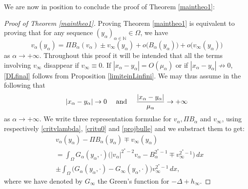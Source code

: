 \documentclass[10pt]{amsart}
\numberwithin{equation}{section}
\newcommand{\Om}{\Omega}
\newcommand{\ma}{\mu_\alpha}
\def \bb{\hbox}
\def \ma{\mu_{\alpha}}
\def \yl{y_{\alpha}}
\def \hi{h_{\infty}}
\def \nn{\mathbb{N}}
\theoremstyle{plain}
\theoremstyle{remark}
\begin{document}
			 
We are now in position to conclude the proof of Theorem \ref{maintheo1}:

\begin{proof}[Proof of Theorem \ref{maintheo1}]
Proving Theorem \ref{maintheo1} is equivalent to proving that for any sequence $(\yl)_{\alpha\in\nn}\in \Om$, we have
\begin{equation}\label{DLfinal}
v_\alpha(y_\alpha) = \Pi B_\alpha(v_\alpha) \pm v_\infty(y_\alpha) + o \big( B_\alpha(y_\alpha) \big) + o \big( v_\infty(y_\alpha) \big)
\end{equation}
as $\alpha \to + \infty$. Throughout this proof it will be intended that all the terms involving $v_\infty$ disappear if $v_\infty \equiv 0$. If $|x_\alpha - y_\alpha| = O(\ma)$ or if $|x_\alpha - y_\alpha| \not \to 0$, \eqref{DLfinal} follows from Proposition \ref{limiteinLinfini}. We may thus assume in the following that
\begin{equation}\label{case2Th1}
|x_\alpha-y_\alpha| \to 0 \quad \bb{ and } \quad \frac{|x_\alpha-y_\alpha|}{\ma} \to +\infty
\end{equation}
as $\alpha \to + \infty$. We write three representation formulae for $v_\alpha, \Pi B_\alpha$ and $v_\infty$, using respectively \eqref{critvlambda}, \eqref{critu0} and \eqref{projbulle} and we substract them to get: 
\begin{equation} \label{reprefinaleTh1}
\begin{aligned}
&v_\alpha(y_\alpha) - \Pi B_\alpha(y_\alpha) \mp v_\infty(y_\alpha) \\
& = \int_{\Om} G_\alpha(y_\alpha, \cdot)\Big( |v_\alpha|^{2^*-2} v_\alpha - B_\alpha^{2^*-1} \mp v_\infty^{2^*-1} \Big)\, dx \\
& \pm \int_{\Om} \Big( G_\alpha(y_\alpha, \cdot) - G_\infty(y_\alpha, \cdot) \Big)  v_\infty^{2^*-1}  \, dx, 
\end{aligned} 
\end{equation}
where we have denoted by $G_\infty$ the Green's function for $-\Delta + \hi$. 

\medskip


\end{proof}
\end{document}
